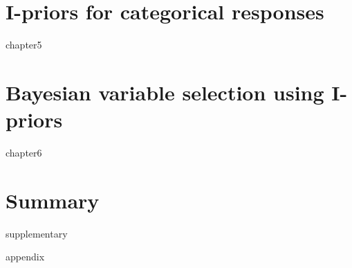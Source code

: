 \documentclass[11pt,twoside,openright]{report}
\begin{document}
\chapter{I-priors for categorical responses}
{chapter5}

\chapter{Bayesian variable selection using I-priors}
{chapter6}

\chapter{Summary}


{supplementary}

\hPrintBibliography

\appendix
{appendix}

\end{document}
